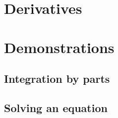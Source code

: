 \documentclass{report}
\begin{document}
\appendix
\chapter{Derivatives}
\label{Titan:the_derivatives}

\chapter{Demonstrations}
\section{Integration by parts}
\label{math:int_by_part}
\section{Solving an equation}
\label{math:solving}

\clearpage


\end{document}

